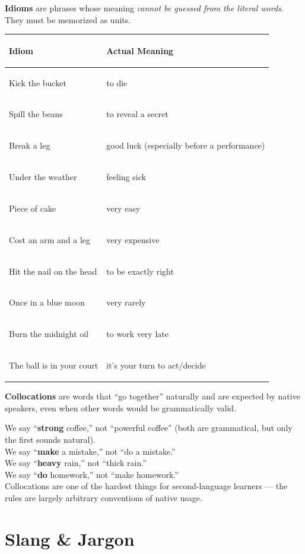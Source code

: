 \documentclass[11pt, letterpaper]{article}
\newcommand{\example}[1]{%
  \begin{tcolorbox}[colback=exbg, colframe=exborder,
    title={\bfseries Example}, arc=3pt, boxrule=1pt]
  #1
  \end{tcolorbox}%
}
\begin{document}
\textbf{Idioms} are phrases whose meaning \emph{cannot be guessed from the literal words}.
They must be memorized as units.

\noindent
{\renewcommand{\arraystretch}{1.5}
\begin{tabularx}{\textwidth}{>{\bfseries\raggedright\arraybackslash}p{4.5cm}
                              >{\raggedright\arraybackslash}X}
\toprule
\rowcolor{tableheadergreen}
\textbf{Idiom} & \textbf{Actual Meaning} \\
\midrule
\rowcolor{rowA}  Kick the bucket          & to die \\
\rowcolor{rowBg} Spill the beans          & to reveal a secret \\
\rowcolor{rowA}  Break a leg              & good luck (especially before a performance) \\
\rowcolor{rowBg} Under the weather        & feeling sick \\
\rowcolor{rowA}  Piece of cake            & very easy \\
\rowcolor{rowBg} Cost an arm and a leg    & very expensive \\
\rowcolor{rowA}  Hit the nail on the head & to be exactly right \\
\rowcolor{rowBg} Once in a blue moon      & very rarely \\
\rowcolor{rowA}  Burn the midnight oil    & to work very late \\
\rowcolor{rowBg} The ball is in your court & it's your turn to act/decide \\
\bottomrule
\end{tabularx}}

\textbf{Collocations} are words that ``go together'' naturally and are expected by native
speakers, even when other words would be grammatically valid.

\example{
We say ``\textbf{strong} coffee,'' not ``powerful coffee'' (both are grammatical, but only the first sounds natural).\\
We say ``\textbf{make} a mistake,'' not ``do a mistake.''\\
We say ``\textbf{heavy} rain,'' not ``thick rain.''\\
We say ``\textbf{do} homework,'' not ``make homework.''\\[4pt]
Collocations are one of the hardest things for second-language learners --- the rules
are largely arbitrary conventions of native usage.
}

\section*{Slang \& Jargon}
\end{document}
